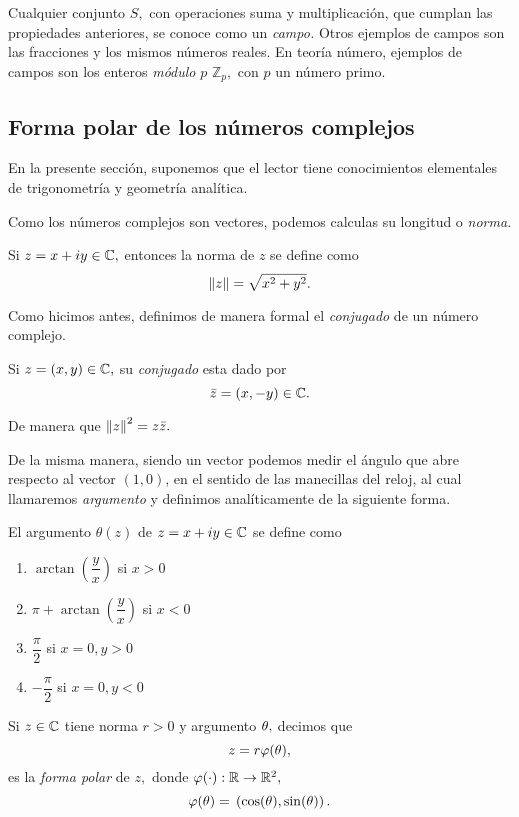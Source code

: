 \begin{rem}
	Cualquier conjunto $S,$ con operaciones suma y multiplicación, que cumplan las propiedades anteriores, se conoce como
	un \emph{campo.} Otros ejemplos de campos son las fracciones y los mismos números reales. En teoría número, ejemplos de
	campos son los enteros \emph{módulo} $p$ $\mathbb{Z}_{p},$ con $p$ un número primo.
\end{rem}

\subsection{Forma polar de los números complejos}

En la presente sección, suponemos que el lector tiene conocimientos elementales de trigonometría y geometría analítica. 

Como los números complejos son vectores, podemos calculas su longitud o \emph{norma.}

\begin{defn}
	Si $z=x+iy\in \mathbb{C},$ entonces la norma de $z$ se define como
	$$
	\left\| z \right\|=\sqrt{x^{2}+y^{2}}.
	$$
\end{defn}

Como hicimos antes, definimos de manera formal el \emph{conjugado} de un número complejo.
\begin{defn}
	Si $z=(x,y)\in \mathbb{C},$ su \emph{conjugado} esta dado por
	$$
	\bar{z}=(x,-y)\in \mathbb{C}.
	$$
\end{defn}

De manera que $\left\| z \right\|^{2}=z\bar{z}.$

De la misma manera, siendo un vector podemos medir el ángulo que abre respecto al vector $(1,0)$, en el sentido de las
manecillas del reloj, al cual llamaremos \emph{argumento} y definimos analíticamente de la siguiente forma.
\begin{defn}
	El argumento $\theta(z)$ de $z=x+iy\in \mathbb{C}$ se define como
	\begin{enumerate}
		\item $\arctan\left( \dfrac{y}{x} \right)$ si $x>0$
		\item $\pi + \arctan\left( \dfrac{y}{x} \right)$ si $x<0$
		\item $\dfrac{\pi}{2}$ si $x=0, y> 0$
		\item $-\dfrac{\pi}{2}$ si $x=0, y< 0$
	\end{enumerate}
	
\end{defn}

\begin{defn}
	Si $z\in \mathbb{C}$ tiene norma $r>0$ y argumento $\theta,$ decimos que $$
	z=r\varphi(\theta),
	$$
	es la \emph{forma polar} de $z,$ donde $\varphi(\cdot):\mathbb{R}\to\mathbb{R}^{2},$
	$$
	\varphi(\theta)=\, \left( \cos(\theta), \sin (\theta) \right).
	$$
\end{defn}

